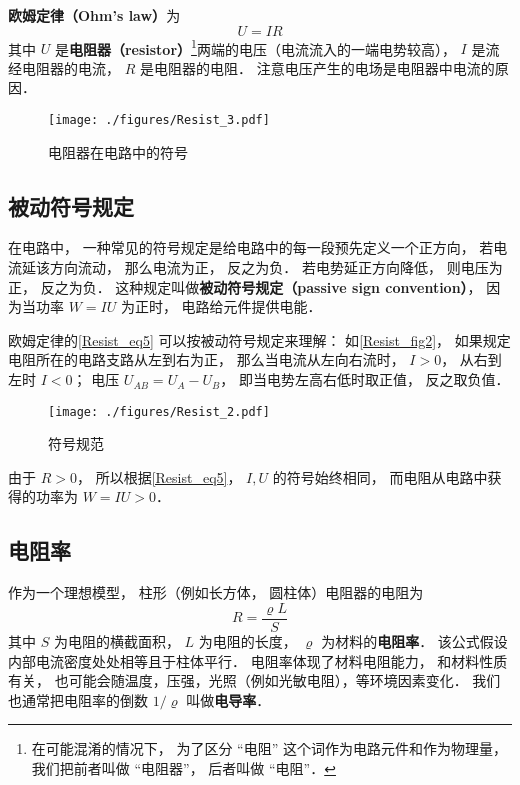 

\textbf{欧姆定律（Ohm's law）}为
\begin{equation}\label{Resist_eq5}
U = IR
\end{equation}
其中 $U$ 是\textbf{电阻器（resistor）}\footnote{在可能混淆的情况下， 为了区分 “电阻” 这个词作为电路元件和作为物理量， 我们把前者叫做 “电阻器”， 后者叫做 “电阻”．}两端的电压（电流流入的一端电势较高）， $I$ 是流经电阻器的电流， $R$ 是电阻器的电阻． 注意电压产生的电场是电阻器中电流的原因．

\begin{figure}[ht]
\centering
\texttt{[image: ./figures/Resist\_3.pdf]}
\caption{电阻器在电路中的符号} \label{Resist_fig3}
\end{figure}

\subsection{被动符号规定}
在电路中， 一种常见的符号规定是给电路中的每一段预先定义一个正方向， 若电流延该方向流动， 那么电流为正， 反之为负． 若电势延正方向降低， 则电压为正， 反之为负． 这种规定叫做\textbf{被动符号规定（passive sign convention）}， 因为当功率 $W = IU$ 为正时， 电路给元件提供电能．

欧姆定律的\autoref{Resist_eq5} 可以按被动符号规定来理解： 如\autoref{Resist_fig2}， 如果规定电阻所在的电路支路从左到右为正， 那么当电流从左向右流时， $I > 0$， 从右到左时 $I < 0$； 电压 $U_{AB} = U_A - U_B$， 即当电势左高右低时取正值， 反之取负值．

\begin{figure}[ht]
\centering
\texttt{[image: ./figures/Resist\_2.pdf]}
\caption{符号规范} \label{Resist_fig2}
\end{figure}

由于 $R > 0$， 所以根据\autoref{Resist_eq5}， $I, U$ 的符号始终相同， 而电阻从电路中获得的功率为 $W = IU > 0$．

\subsection{电阻率}
作为一个理想模型， 柱形（例如长方体， 圆柱体）电阻器的电阻为
\begin{equation}
R = \frac{\varrho L}{S} 
\end{equation}
其中 $S$ 为电阻的横截面积， $L$ 为电阻的长度， $\varrho$ 为材料的\textbf{电阻率}． 该公式假设内部电流密度处处相等且于柱体平行． 电阻率体现了材料电阻能力， 和材料性质有关， 也可能会随温度，压强，光照（例如光敏电阻），等环境因素变化． 我们也通常把电阻率的倒数 $1/\varrho$ 叫做\textbf{电导率}．

